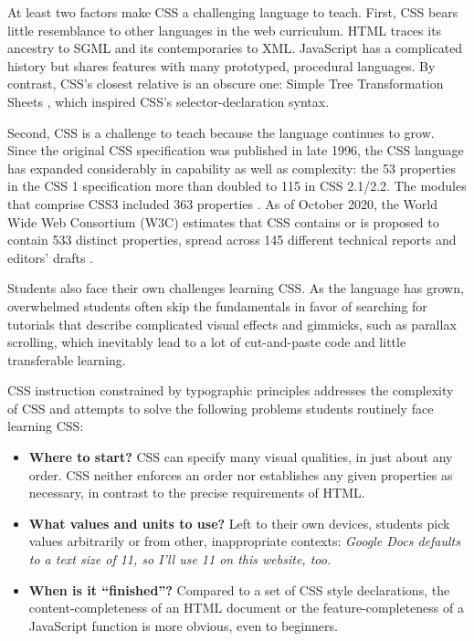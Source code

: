 \documentclass[sigplan,screen]{acmart}
\begin{document}
At least two factors make CSS a challenging language to teach. First, CSS bears little resemblance to other languages in the web curriculum. HTML traces its ancestry to SGML and its contemporaries to XML. JavaScript has a complicated history but shares features with many prototyped, procedural languages. By contrast, CSS’s closest relative is an obscure one: Simple Tree Transformation Sheets \cite{w3c:briefhistory}, which inspired CSS's selector-declaration syntax.

Second, CSS is a challenge to teach because the language continues to grow. Since the original CSS specification was published in late 1996, the CSS language has expanded considerably in capability as well as complexity: the 53 properties in the CSS 1 specification more than doubled to 115 in CSS 2.1/2.2. The modules that comprise CSS3 included  363 properties \cite{jom:css}. As of October 2020, the World Wide Web Consortium (W3C) estimates that CSS contains or is proposed to contain 533 distinct properties, spread across 145 different technical reports and editors' drafts \cite{w3c:iop}.

 Students also face their own challenges learning CSS. As the language has grown, overwhelmed students often skip the fundamentals in favor of searching for tutorials that describe complicated visual effects and gimmicks, such as parallax scrolling, which inevitably lead to a lot of cut-and-paste code and little transferable learning.

CSS instruction constrained by typographic principles addresses the  complexity of CSS and attempts to solve the following problems students routinely face learning CSS:

\begin{itemize}
  \item \textbf{Where to start?} CSS can specify many visual qualities,  in just about any order. CSS neither enforces an order nor establishes any given properties as necessary, in contrast to the precise requirements of HTML.
  \item \textbf{What values and units to use?} Left to their own devices, students pick values arbitrarily or from other, inappropriate contexts: {\itshape Google Docs defaults to a text size of 11, so I’ll use 11 on this website, too.}
  \item \textbf{When is it “finished”?} Compared to a set of CSS style declarations, the content-completeness of an HTML document or the feature-completeness of a JavaScript function is more obvious, even to beginners.
\end{itemize}
\end{document}
